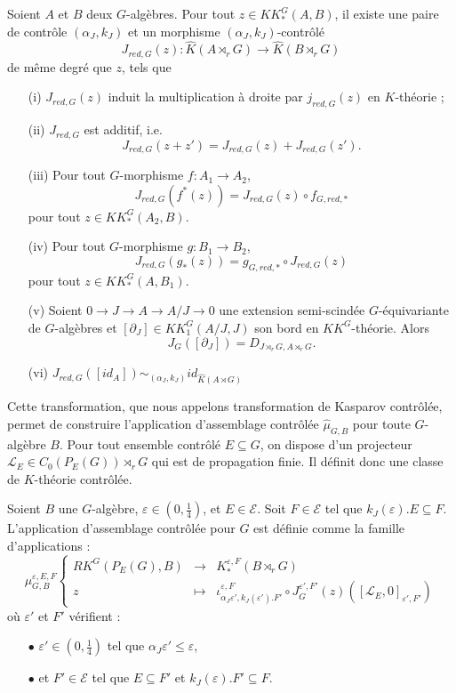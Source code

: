 \begin{prop}
Soient $A$ et $B$ deux $G$-algèbres. Pour tout $z\in KK^G_*(A,B)$, il existe une paire de contrôle $(\alpha_J,k_J)$ et un morphisme $(\alpha_J,k_J)$-contrôlé
\[J_{red,G}(z) : \hat K(A\rtimes_r G)\rightarrow \hat K(B\rtimes_r G)\]
de même degré que $z$, tels que
\begin{enumerate}
\item[(i)] $J_{red,G}(z)$ induit la multiplication à droite par $j_{red,G}(z)$ en $K$-théorie ;
\item[(ii)] $J_{red,G}$ est additif, i.e.
\[J_{red,G}(z+z')=J_{red,G}(z)+J_{red,G}(z').\]
\item[(iii)] Pour tout $G$-morphisme $f : A_1\rightarrow A_2$,
\[J_{red,G}(f^*(z))=J_{red,G}(z)\circ f_{G,red,*}\] pour tout $z\in KK_*^G(A_2,B)$.
\item[(iv)] Pour tout $G$-morphisme $g : B_1\rightarrow B_2$,
\[J_{red,G}(g_*(z))= g_{G,red,*}\circ J_{red,G}(z)\] pour tout $z\in KK_*^G(A,B_1)$.
\item[(v)] Soient $0\rightarrow J\rightarrow A\rightarrow A/J\rightarrow 0$ une extension semi-scindée $G$-équivariante de $G$-algèbres et  $[\partial_J]\in KK_1^G(A/J,J)$ son bord en $KK^G$-théorie. Alors 
\[J_G([\partial_J])=D_{J\rtimes_r G,A\rtimes_rG}.\] 
\item[(vi)] $J_{red,G}([id_A]) \sim_{(\alpha_J,k_J)} id_{\hat K(A\rtimes G)}$
\end{enumerate}
\end{prop}

Cette transformation, que nous appelons transformation de Kasparov contrôlée, permet de construire l'application d'assemblage contrôlée $\hat\mu_{G,B}$ pour toute $G$-algèbre $B$. Pour tout ensemble contrôlé $E\subseteq G$, on dispose d'un projecteur $\mathcal L_E\in C_0(P_E(G))\rtimes_r G$ qui est de propagation finie. Il définit donc une classe de $K$-théorie contrôlée.

\begin{definition}
Soient $B$ une $G$-algèbre, $\varepsilon\in (0,\frac{1}{4})$, et $E\in\mathcal E$. Soit $F\in \mathcal E$ tel que $k_J(\varepsilon).E \subseteq F$. L'application d'assemblage contrôlée pour $G$ est définie comme la famille d'applications :
\[\mu_{G,B}^{\varepsilon,E,F}\left\{
\begin{array}{rcl}
RK^G(P_E(G), B) & \rightarrow & K_*^{\varepsilon, F}(B\rtimes_r G)\\
z & \mapsto & \iota_{\alpha_J\varepsilon', k_J(\varepsilon').F'}^{\varepsilon,F} \circ J_G^{\varepsilon', F'}(z)([\mathcal L_E,0]_{\varepsilon' , F'})
\end{array}\right.\]
où $\varepsilon'$ et $F'$ vérifient :
\begin{itemize}
\item[$\bullet$] $\varepsilon'\in (0,\frac{1}{4})$ tel que $\alpha_J \varepsilon'\leq \varepsilon$,
\item[$\bullet$] et $F'\in\mathcal E$ tel que $E\subseteq F'$ et $k_J(\varepsilon).F'\subseteq F$.
\end{itemize}
\end{definition}

